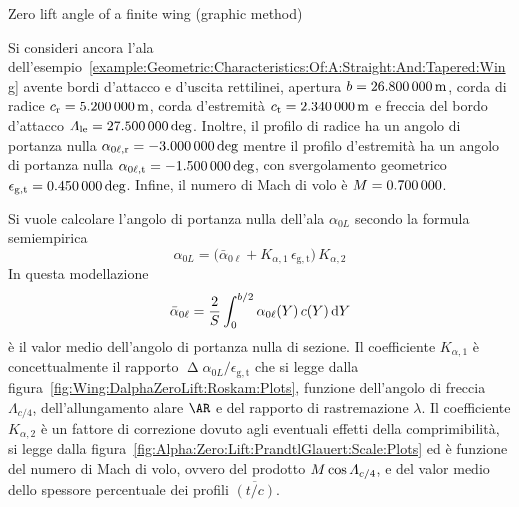 \documentclass[[12pt,twoside]{book}
\begin{document}
%
\begin{myExampleX}{Zero lift angle of a finite wing (graphic method)}{\ \myIconGraph\ }%
\label{example:Zero:Lift:Angle:Graphic:Method}
%

%
\noindent
Si consideri ancora l'ala dell'esempio~\ref{example:Geometric:Characteristics:Of:A:Straight:And:Tapered:Wing} avente bordi d'attacco e d'uscita rettilinei,
apertura $b=\SI[round-precision=1]{\mySpanWingMT}{\metre}$,
corda di radice $c_\mathrm{r}=\SI[round-precision=2]{\myChordRootWingMT}{\metre}$,
corda d'estremità $c_\mathrm{t}=\SI[round-precision=2]{\myChordTipWingMT}{\metre}$
e freccia del bordo d'attacco
$\Lambda_\mathrm{le}=\SI[round-precision=1]{\mySweepLEWingDEG}{\deg}$.
Inoltre, il profilo di radice ha un angolo di portanza nulla
$\alpha_{0\ell,\mathrm{r}}=\SI[round-precision=1]{\myAlphaZeroLiftRootWingDEG}{\deg}$
mentre il profilo d'estremità ha un angolo di portanza nulla
$\alpha_{0\ell,\mathrm{t}}=\SI[round-precision=1]{\myAlphaZeroLiftTipWingDEG}{\deg}$,
con svergolamento geometrico
$\epsilon_{\mathrm{g,t}}=\SI[round-precision=1]{\myTwistWingDEG}{\deg}$.
Infine, il numero di Mach di volo è $\Mach=\SI[round-precision=2]{\myMach}{}$.

Si vuole calcolare l'angolo di portanza nulla dell'ala $\alpha_{0L}$ 
secondo la formula semiempirica
\begin{equation}
\label{eq:Wing:Alpha:Zero:Lift:Roskam:Datcom}
\alpha_{0L} =
  \Big(
    \bar{\alpha}_{0\ell} + K_{\alpha,1} \, \epsilon_{\mathrm{g,t}}
  \Big) 
  \, K_{\alpha,2}
\end{equation}
In questa modellazione
\[
\bar{\alpha}_{0\ell} = \frac{2}{S} \int_0^{b/2} \alpha_{0\ell}(Y)\, c(Y) \diff{Y}
\]
è il valor medio dell'angolo di portanza nulla di sezione.
Il coefficiente
$K_{\alpha,1}$ è concettualmente il rapporto
$\upDelta\alpha_{0L}/\epsilon_{\mathrm{g,t}}$ che si legge dalla
figura~\ref{fig:Wing:DalphaZeroLift:Roskam:Plots},
funzione dell'angolo di freccia $\Lambda_{c/4}$, dell'allungamento alare $\AR$
e del rapporto di rastremazione $\lambda$.
Il coefficiente
$K_{\alpha,2}$ è un fattore di correzione dovuto agli eventuali
effetti della comprimibilità, si legge dalla figura~\ref{fig:Alpha:Zero:Lift:PrandtlGlauert:Scale:Plots}
ed è funzione del numero di Mach di volo, ovvero del prodotto $\Mach\cos\Lambda_{c/4}$,
e del valor medio dello spessore percentuale dei profili $\overline{(t/c)}$.


\end{myExampleX}
\end{document}
